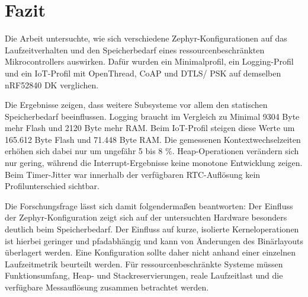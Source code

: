 \chapter{Fazit}
\label{ch:fazit}

Die Arbeit untersuchte, wie sich verschiedene Zephyr-Konfigurationen auf das Laufzeitverhalten und den Speicherbedarf eines ressourcenbeschr{\"a}nkten Mikrocontrollers auswirken. Daf{\"u}r wurden ein Minimalprofil, ein Logging-Profil und ein IoT-Profil mit OpenThread, CoAP und DTLS/ PSK auf demselben nRF52840 DK verglichen.

Die Ergebnisse zeigen, dass weitere Subsysteme vor allem den statischen Speicherbedarf beeinflussen. Logging braucht im Vergleich zu Minimal 9304 Byte mehr Flash und 2120 Byte mehr RAM. Beim IoT-Profil steigen diese Werte um 165.612 Byte Flash und 71.448 Byte RAM. Die gemessenen Kontextwechselzeiten erh{\"o}hen sich dabei nur um ungef{\"a}hr 5 bis 8 \%. Heap-Operationen ver{\"a}ndern sich nur gering, w{\"a}hrend die Interrupt-Ergebnisse keine monotone Entwicklung zeigen. Beim Timer-Jitter war innerhalb der verf{\"u}gbaren RTC-Aufl{\"o}sung kein Profilunterschied sichtbar.

Die Forschungsfrage l{\"a}sst sich damit folgenderma{\ss}en beantworten: Der Einfluss der Zephyr-Konfiguration zeigt sich auf der untersuchten Hardware besonders deutlich beim Speicherbedarf. Der Einfluss auf kurze, isolierte Kerneloperationen ist hierbei geringer und pfadabh{\"a}ngig und kann von {\"A}nderungen des Bin{\"a}rlayouts {\"u}berlagert werden. Eine Konfiguration sollte daher nicht anhand einer einzelnen Laufzeitmetrik beurteilt werden. F{\"u}r ressourcenbeschr{\"a}nkte Systeme m{\"u}ssen Funktionsumfang, Heap- und Stackreservierungen, reale Laufzeitlast und die verf{\"u}gbare Messaufl{\"o}sung zusammen betrachtet werden.
